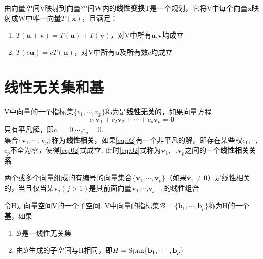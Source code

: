 \begin{definition}
由向量空间V映射到向量空间W内的\textbf{线性变换}T是一个规划，它将V中每个向量$\mathbf{x}$映射成W中唯一向量$T(\mathbf{x})$，且满足：
\begin{enumerate}
\item $T(\mathbf{u+v})=T(\mathbf{u})+T(\mathbf{v})$，对V中所有$\mathbf{u}$,$\mathbf{v}$均成立
\item $T(c\mathbf{u})=cT(\mathbf{u})$，对V中所有$\mathbf{u}$及所有数$c$均成立
\end{enumerate}
\end{definition}\vspace{4ex}

\section{线性无关集和基}
V中向量的一个指标集$\{v_1,\cdots,v_p\}$称为是\textbf{线性无关}的，如果向量方程
\begin{equation}
c_1\mathbf{v}_1+c_2\mathbf{v}_2+\cdots+c_p\mathbf{v}_p=\mathbf{0}\label{eq:02}
\end{equation}
只有平凡解，即$c_1=0$,$\cdots$,$c_p=0$.\\
集合$\{\mathbf{v}_1,\cdots,\mathbf{v}_p\}$称为\textbf{线性相关}，如果\eqref{eq:02}有一个非平凡的解，即存在某些权$c_1$,$\cdots$,$c_p$不全为零，使得\eqref{eq:02}式成立. 此时\eqref{eq:02}式称为$\mathbf{v}_1$,$\cdots$,$\mathbf{v}_p$之间的一个\textbf{线性相关关系}\vspace{4ex}

\begin{TheoremOne}
两个或多个向量组成的有编号的向量集合$\{\mathbf{v}_1,\cdots,\mathbf{v}_p\}$（如果$\mathbf{v}_1\neq\mathbf{0}$）是线性相关的，当且仅当某$\mathbf{v}_j(j>1)$是其前面向量$\mathbf{v}_1$,$\cdots$,$\mathbf{v}_{j-1}$的线性组合
\end{TheoremOne}\vspace{4ex}

\begin{definition}
令H是向量空间V的一个子空间. V中向量的指标集$\mathcal{B}=\{\mathbf{b}_1,\cdots,\mathbf{b}_p\}$称为H的一个\textbf{基}，如果
\begin{enumerate}
\item $\mathcal{B}$是一线性无关集
\item 由$\mathcal{B}$生成的子空间与H相同，即$H=\operatorname{Span}\{\mathbf{b}_1,\cdots,\mathbf{b}_p\}$
\end{enumerate}
\end{definition}\vspace{4ex}


